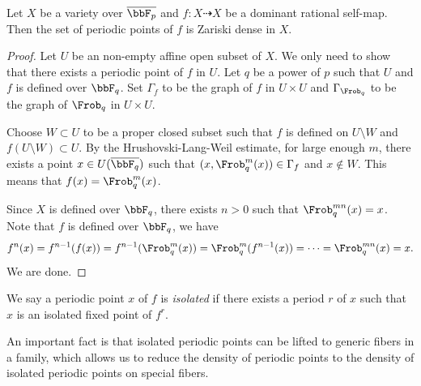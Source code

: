   \begin{lemma}\label{lem:density_of_periodic_points_over_finite_fields}
    Let $X$ be a variety over $\overline{\bbF_p}$ and $f: X \dashrightarrow X$ be a dominant rational self-map.
    Then the set of periodic points of $f$ is Zariski dense in $X$.
  \end{lemma}
  \begin{proof}
    Let $U$ be an non-empty affine open subset of $X$.
    We only need to show that there exists a periodic point of $f$ in $U$.
    Let $q$ be a power of $p$ such that $U$ and $f$ is defined over $\bbF_q$.
    Set $\Gamma_f$ to be the graph of $f$ in $U \times U$ and $\Gamma_{\Frob_q}$ to be the graph of $\Frob_q$ in $U \times U$.

    Choose $W \subset U$ to be a proper closed subset such that $f$ is defined on $U \setminus W$ and $f(U \setminus W) \subset U$.
    By the Hrushovski-Lang-Weil estimate, for large enough $m$, there exists a point $x \in U(\overline{\bbF_q})$ such that $(x, \Frob_q^m(x)) \in \Gamma_f$ and $x \notin W$.
    This means that $f(x) = \Frob_q^m(x)$.

    Since $X$ is defined over $\bbF_q$, there exists $n > 0$ such that $\Frob_q^{mn}(x) = x$.
    Note that $f$ is defined over $\bbF_q$, we have 
    \[ f^n(x) = f^{n-1}(f(x)) = f^{n-1}(\Frob_q^m(x)) = \Frob_q^m(f^{n-1}(x)) = \cdots = \Frob_q^{mn}(x) = x. \]
    We are done.
  \end{proof}

  \begin{definition}
    We say a periodic point $x$ of $f$ is \emph{isolated} if there exists a period $r$ of $x$ such that $x$ is an isolated fixed point of $f^r$.
  \end{definition}

  An important fact is that isolated periodic points can be lifted to generic fibers in a family, which allows us to reduce the density of periodic points to the density of isolated periodic points on special fibers.

